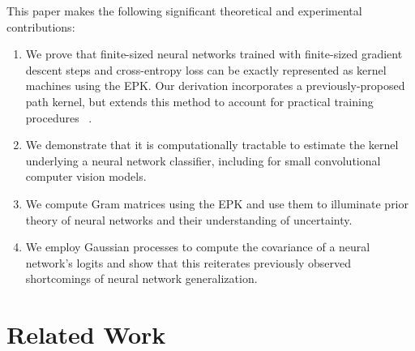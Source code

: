 This paper makes the following significant theoretical and experimental contributions:
\begin{enumerate}
    \item We prove that finite-sized neural networks trained with finite-sized gradient descent steps and cross-entropy loss can be exactly represented as kernel machines using the EPK. Our derivation incorporates a previously-proposed path kernel, but extends this method to account for practical training procedures ~\citep{domingos2020every, chen2021equivalence}.
  
    \item We demonstrate that it is computationally tractable to estimate the kernel underlying a neural network classifier, including for small convolutional computer vision models.
    \item We compute Gram matrices using the EPK and use them to illuminate prior theory of neural networks and their understanding of uncertainty. 
    \item We employ Gaussian processes to compute the covariance of a neural network's logits and show that this reiterates previously observed shortcomings of neural network generalization.
\end{enumerate}

\section{Related Work}

